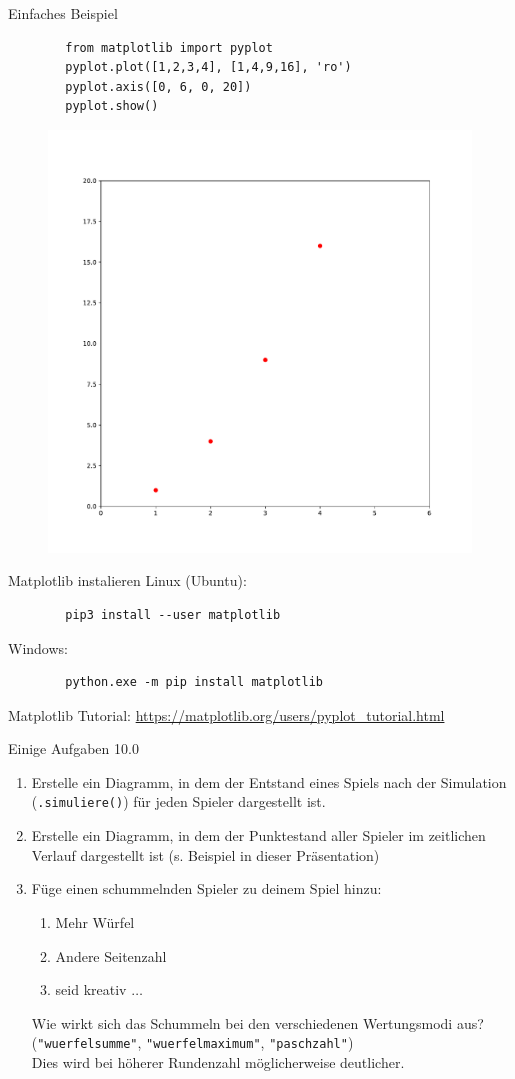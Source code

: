 \begin{frame}[fragile]{Einfaches Beispiel}
	\begin{lstlisting}
		from matplotlib import pyplot
		pyplot.plot([1,2,3,4], [1,4,9,16], 'ro')
		pyplot.axis([0, 6, 0, 20])
		pyplot.show()
	\end{lstlisting}
	
	\begin{figure}[h]
		\includegraphics[width=.5\linewidth]{../images/matplotlib_example1}
	\end{figure}
\end{frame}

\begin{frame}[fragile]{Matplotlib instalieren}
	Linux (Ubuntu):
	\begin{lstlisting}
		pip3 install --user matplotlib
	\end{lstlisting}
	
	Windows:
	\begin{lstlisting}
		python.exe -m pip install matplotlib
	\end{lstlisting}
	Matplotlib Tutorial: \url{https://matplotlib.org/users/pyplot_tutorial.html}
\end{frame}

\begin{frame}{Einige Aufgaben 10.0}
	\begin{enumerate}
		\item Erstelle ein Diagramm, in dem der Entstand eines Spiels nach der Simulation (\texttt{.simuliere()}) für jeden Spieler dargestellt ist.
		\item Erstelle ein Diagramm, in dem der Punktestand aller Spieler im zeitlichen Verlauf dargestellt ist (s. Beispiel in dieser Präsentation)
		\item Füge einen schummelnden Spieler zu deinem Spiel hinzu:
		\begin{enumerate}
			\item Mehr Würfel
			\item Andere Seitenzahl
			\item seid kreativ $\dots$
		\end{enumerate}
		Wie wirkt sich das Schummeln bei den verschiedenen Wertungsmodi aus? \\
		(\texttt{"wuerfelsumme"}, \texttt{"wuerfelmaximum"}, \texttt{"paschzahl"})\\
		Dies wird bei höherer Rundenzahl möglicherweise deutlicher.
	\end{enumerate}
\end{frame}

